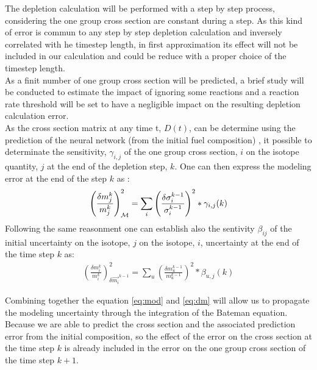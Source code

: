 \documentclass[dvips,12pt]{article}
\begin{document}
The depletion calculation will be performed with a
step by step process, considering the one group
cross section are constant during a step. As this
kind of error is commun to any step by step
depletion calculation and inversely correlated
with he timestep length, in first approximation
its effect will not be included in our calculation
and could be reduce with a proper choice of the
timestep length. \\
As a finit number of one group cross section will
be predicted, a brief study will be conducted to
estimate the impact of ignoring some reactions and
a reaction rate threshold will be set to have a
negligible impact on the resulting depletion
calculation error.\\

As the cross section matrix at any time t, $D(t)$,
can be determine using the prediction of the
neural network (from the initial fuel composition)
, it possible to determinate the sensitivity,
$\gamma_{i,j}$  of the one group cross section,
$i$ on the isotope quantity, $j$ at the end of the
depletion step, $k$. One can then express the
modeling error at the end of the step $k$ as :
\begin{align}
  \left( \frac{\delta m_j^{k}}{m_j^{k}} \right)^{2} _{{\cal M}} = \sum_{i}\left( \frac{\delta \sigma_i^{k-1}}{\sigma_i^{k-1}} \right)^{2} *\gamma_{i,j}(k)\label{eq:mod}
\end{align}
Following the same reasonment one can establish
also the sentivity $\beta_{ij}$ of the initial
uncertainty on the isotope, $j$ on the isotope,
$i$, uncertainty at the end of the time step $k$
as:
\begin{align}
  \left( \frac{\delta m_i^{k}}{m_i^{k}} \right)^{2} _{\delta \vec{m_i}^{k-1} } = \sum_{u}\left( \frac{\delta m_u^{k-1}}{m_u^{k-1}} \right)^{2} *\beta_{u,j}(k) \label{eq:dm}
\end{align}



Combining together the equation \eqref{eq:mod} and
\eqref{eq:dm} will allow us to propagate the
modeling uncertainty through the integration of
the Bateman equation. Because we are able to
predict the cross section and the associated
prediction error from the initial composition, so
the effect of the error on the cross section at
the time step $k$ is already included in the error
on the one group cross section of the time step
$k+1$.
\end{document}
